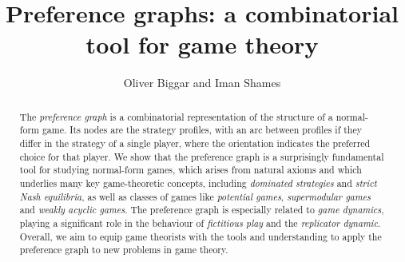 \documentclass[preprint,authoryear]{elsarticle}
\title{Preference graphs: a combinatorial tool for game theory}
\author{Oliver Biggar and Iman Shames}
\date{}
\begin{document}
\begin{abstract}
    The \emph{preference graph} is a combinatorial representation of the structure of a normal-form game. Its nodes are the strategy profiles, with an arc between profiles if they differ in the strategy of a single player, where the orientation indicates the preferred choice for that player. We show that the preference graph is a surprisingly fundamental tool for studying normal-form games, which arises from natural axioms and which underlies many key game-theoretic concepts, including \emph{dominated strategies} and \emph{strict Nash equilibria}, as well as classes of games like \emph{potential games}, \emph{supermodular games} and \emph{weakly acyclic games}. The preference graph is especially related to \emph{game dynamics}, playing a significant role in the behaviour of \emph{fictitious play} and the \emph{replicator dynamic}. Overall, we aim to equip game theorists with the tools and understanding to apply the preference graph to new problems in game theory.
\end{abstract}
\end{document}
